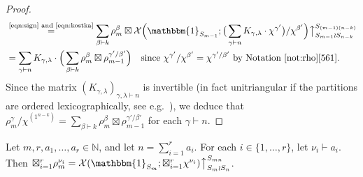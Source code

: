 \documentclass[ALCO, Unicode]{cedram}
\newcommand{\triv}{\mathbbm{1}}
\newcommand{\up}{\big\uparrow}
\newcommand{\cX}{\mathcal{X}}
\newcommand{\N}{\mathbb{N}}
\begin{document}
\begin{proof}
\begin{align*}
		&\overset{\normalfont\tiny\text{\eqref{eqn:sign} and \eqref{eqn:kostka}}}{=} \sum_{\beta\vdash k} \rho^\beta_m \boxtimes \cX \Big( \triv_{S_{m-1}}; \big( \sum_{\gamma\vdash n} K_{\gamma,\lambda}\cdot \chi^{\gamma'} \big) /\chi^{\beta'} \Big) \up_{S_{m-1}\wr S_{n-k}}^{S_{(m-1)(n-k)}} \\
		&= \sum_{\gamma\vdash n} K_{\gamma,\lambda} \cdot \Big( \sum_{\beta\vdash k} \rho^\beta_m \boxtimes \rho^{\gamma'/\beta'}_{m-1} \Big)\quad\text{since $\chi^{\gamma'}/\chi^{\beta'}=\chi^{\gamma'/\beta'}$ by Notation~\ref{not:rho}\ref{561}}.
	\end{align*}
	Since the matrix $(K_{\gamma,\lambda})_{\gamma,\lambda\vdash n}$ is invertible (in fact unitriangular if the partitions are ordered lexicographically, see e.g.~\cite[Chapter 2]{JK}), we deduce that $\rho^\gamma_m/\chi^{(1^{n-k})} = \sum_{\beta\vdash k} \rho^\beta_m \boxtimes \rho^{\gamma'/\beta'}_{m-1}$ for each $\gamma\vdash n$.
\end{proof}

\begin{lemma}\label{lem:cX}
	Let $m,r,a_1,\dotsc,a_r\in\N$, and let $n=\sum_{i=1}^r a_i$. For each $i\in\{1,\dotsc,r\}$, let $\nu_i\vdash a_i$. Then $\boxtimes_{i=1}^r \rho_m^{\nu_i} = \cX(\triv_{S_m};\boxtimes_{i=1}^r \chi^{\nu_i} )\up_{S_m\wr S_n}^{S_{mn}}$.
\end{lemma}
\end{document}
